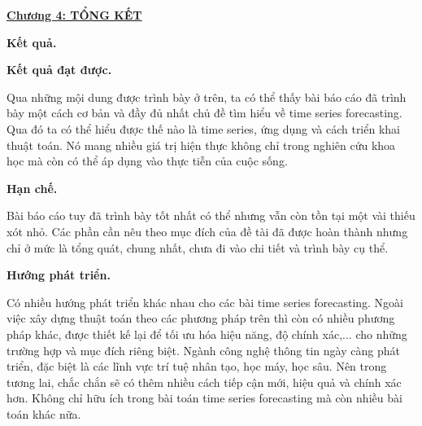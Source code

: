 \newpage
\changefontsizes{16pt}
\centerline{\textbf{\hyperlink{page.7}{Chương 4: TỔNG KẾT}}}


%
\bigskip
\changefontsizes{15pt}

\setlength{\parindent}{0.0cm}
\textbf{Kết quả.}

\changefontsizes{14pt}
\vspace{0.5cm}
\setlength{\parindent}{0cm}
\textbf{Kết quả đạt được.}

\vspace{0.5cm}
\changefontsizes{13pt}


\setlength{\parindent}{0cm}
Qua những mội dung được trình bày ở trên, ta có thể thấy bài báo cáo đã trình bày một cách cơ bản và đầy đủ nhất chủ đề tìm hiểu về time series forecasting. Qua đó ta có thể hiểu được thế nào là time series, ứng dụng và cách triển khai thuật toán. Nó mang nhiều giá trị hiện thực không chỉ trong nghiên cứu khoa học mà còn có thể áp dụng vào thực tiễn của cuộc sống.


\vspace{0.5cm}
\changefontsizes{14pt}

\textbf{Hạn chế.}


\vspace{0.5cm}
\changefontsizes{13pt}


Bài báo cáo tuy đã trình bày tốt nhất có thể nhưng vẫn còn tồn tại một vài thiếu xót nhỏ. Các phần cần nêu theo mục đích của đề tài đã được hoàn thành nhưng chỉ ở mức là tổng quát, chung nhất, chưa đi vào chi tiết và trình bày cụ thể.


\vspace{0.5cm}
\changefontsizes{15pt}

\setlength{\parindent}{0.0cm}
\textbf{Hướng phát triển.}



\changefontsizes{13pt}
\vspace{0.5cm}


Có nhiều hướng phát triển khác nhau cho các bài time series forecasting. Ngoài việc xây dựng thuật toán theo các phương pháp trên thì còn có nhiều phương pháp khác, được thiết kế lại để tối ưu hóa hiệu năng, độ chính xác,... cho những trường hợp và mục đích riêng biệt. Ngành công nghệ thông tin ngày càng phát triển, đặc biệt là các lĩnh vực trí tuệ nhân tạo, học máy, học sâu. Nên trong tương lai, chắc chắn sẽ có thêm nhiều cách tiếp cận mới, hiệu quả và chính xác hơn. Không chỉ hữu ích trong bài toán time series forecasting mà còn nhiều bài toán khác nữa.

